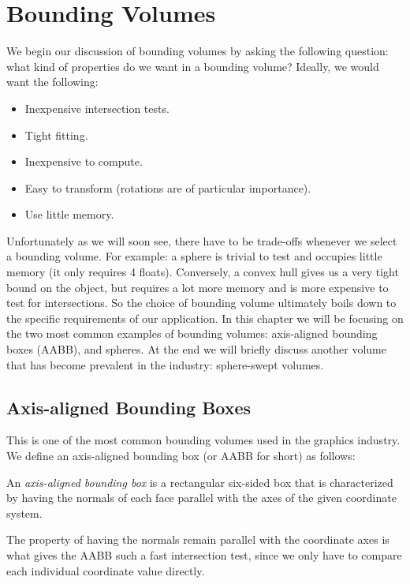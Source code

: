 \chapter{Bounding Volumes}
  We begin our discussion of bounding volumes by asking the following
  question: what kind of properties do we want in a bounding volume?
  Ideally, we would want the following:
  \begin{itemize}
    \item Inexpensive intersection tests.
    \item Tight fitting.
    \item Inexpensive to compute.
    \item Easy to transform (rotations are of particular importance).
    \item Use little memory.
  \end{itemize}

  Unfortunately as we will soon see, there have to be trade-offs whenever we
  select a bounding volume. For example: a sphere is trivial to test and
  occupies little memory (it only requires 4 floats). Conversely, a convex
  hull gives us a very tight bound on the object, but requires a lot more
  memory and is more expensive to test for intersections. So the choice of
  bounding volume ultimately boils down to the specific requirements of our
  application. In this chapter we will be focusing on the two most common
  examples of bounding volumes: axis-aligned bounding boxes (AABB), and
  spheres. At the end we will briefly discuss another volume that has become
  prevalent in the industry: sphere-swept volumes.

  \section{Axis-aligned Bounding Boxes}
    This is one of the most common bounding volumes used in the graphics
    industry. We define an axis-aligned bounding box (or AABB for short) as
    follows:
    \begin{defn}
      An \emph{axis-aligned bounding box} is a rectangular six-sided box that is
      characterized by having the normals of each face parallel with the axes of
      the given coordinate system.
    \end{defn}

    The property of having the normals remain parallel with the coordinate axes
    is what gives the AABB such a fast intersection test, since we only have to
    compare each individual coordinate value directly.

